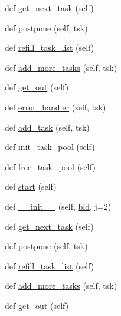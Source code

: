 \begin{DoxyCompactItemize}
\item 
def \hyperlink{classwaflib_1_1_runner_1_1_parallel_a13620afd7fb0dac47215c1a434c3a79a}{get\+\_\+next\+\_\+task} (self)
\item 
def \hyperlink{classwaflib_1_1_runner_1_1_parallel_ab025fd073c2f52e72df1a3bc8d188d0e}{postpone} (self, tsk)
\item 
def \hyperlink{classwaflib_1_1_runner_1_1_parallel_a2f7785b4be91f45b53a9f294fb3a990e}{refill\+\_\+task\+\_\+list} (self)
\item 
def \hyperlink{classwaflib_1_1_runner_1_1_parallel_a7501769205be6d24343c054f46e43289}{add\+\_\+more\+\_\+tasks} (self, tsk)
\item 
def \hyperlink{classwaflib_1_1_runner_1_1_parallel_aa5803cc70ce58b6f1ed09d8e4414aeef}{get\+\_\+out} (self)
\item 
def \hyperlink{classwaflib_1_1_runner_1_1_parallel_a5687053d52ada326ac8754dc15bd5138}{error\+\_\+handler} (self, tsk)
\item 
def \hyperlink{classwaflib_1_1_runner_1_1_parallel_a7b6dec41418a4eb5a39aa35756ef39c6}{add\+\_\+task} (self, tsk)
\item 
def \hyperlink{classwaflib_1_1_runner_1_1_parallel_a847fede29cb9dfe31b6b694e1044d100}{init\+\_\+task\+\_\+pool} (self)
\item 
def \hyperlink{classwaflib_1_1_runner_1_1_parallel_aed9785fdb3b1d54bbdc5520942ebe237}{free\+\_\+task\+\_\+pool} (self)
\item 
def \hyperlink{classwaflib_1_1_runner_1_1_parallel_a091adebadfabd759640c7347de4b05e2}{start} (self)
\item 
def \hyperlink{classwaflib_1_1_runner_1_1_parallel_a0c0a52852b556178d86233e354383f51}{\+\_\+\+\_\+init\+\_\+\+\_\+} (self, \hyperlink{classwaflib_1_1_runner_1_1_parallel_a710f2069db915f1b04538ed7989511ff}{bld}, j=2)
\item 
def \hyperlink{classwaflib_1_1_runner_1_1_parallel_a13620afd7fb0dac47215c1a434c3a79a}{get\+\_\+next\+\_\+task} (self)
\item 
def \hyperlink{classwaflib_1_1_runner_1_1_parallel_ab025fd073c2f52e72df1a3bc8d188d0e}{postpone} (self, tsk)
\item 
def \hyperlink{classwaflib_1_1_runner_1_1_parallel_a2f7785b4be91f45b53a9f294fb3a990e}{refill\+\_\+task\+\_\+list} (self)
\item 
def \hyperlink{classwaflib_1_1_runner_1_1_parallel_a7501769205be6d24343c054f46e43289}{add\+\_\+more\+\_\+tasks} (self, tsk)
\item 
def \hyperlink{classwaflib_1_1_runner_1_1_parallel_aa5803cc70ce58b6f1ed09d8e4414aeef}{get\+\_\+out} (self)

\end{DoxyCompactItemize}
